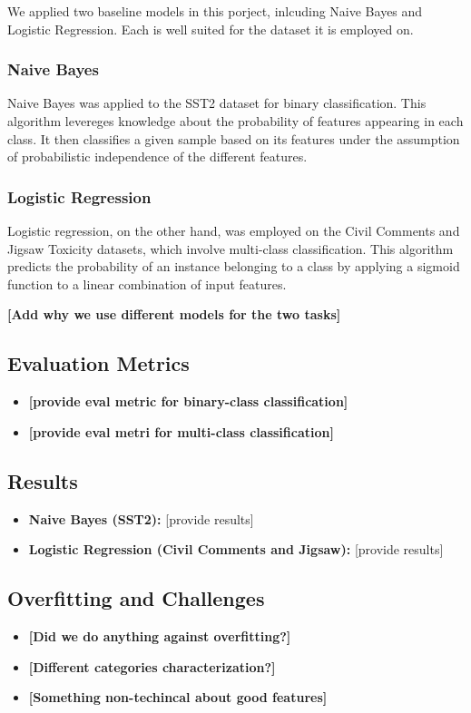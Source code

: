 \documentclass[10pt,a4paper,oneside]{article} %
\begin{document}
We applied two baseline models in this porject, inlcuding Naive Bayes and Logistic Regression. Each is well suited for the dataset it is employed on. 
\subsubsection{Naive Bayes}
Naive Bayes was applied to the SST2 dataset for binary classification.  This algorithm levereges knowledge about the probability of features appearing in each class. It then classifies a given sample based on its features under the assumption of probabilistic independence of the different features. 
\subsubsection{Logistic Regression}
 Logistic regression, on the other hand, was employed on the Civil Comments and Jigsaw Toxicity datasets, which involve multi-class classification. This algorithm predicts the probability of an instance belonging to a class by applying a sigmoid function to a linear combination of input features. 
 
 \textbf{[Add why we use different models for the two tasks]}
\subsection{Evaluation Metrics}
\begin{itemize}
    \item \textbf{[provide eval metric for binary-class classification]}
    \item \textbf{[provide eval metri for multi-class classification]}
\end{itemize}

\subsection{Results}
\begin{itemize}
    \item \textbf{Naive Bayes (SST2):} [provide results]
    \item \textbf{Logistic Regression (Civil Comments and Jigsaw):} [provide results]
\end{itemize}

\subsection{Overfitting and Challenges}
\begin{itemize}
    \item \textbf{[Did we do anything against overfitting?]}
    \item \textbf{[Different categories characterization?]}
    \item \textbf{[Something non-techincal about good features]}

\end{itemize}
\end{document}
